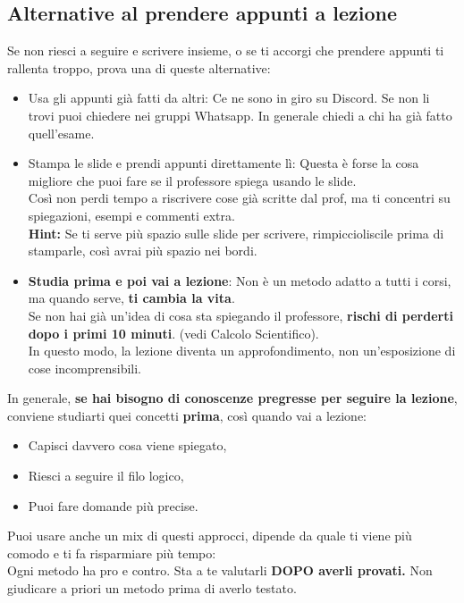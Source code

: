 \documentclass[18pt]{extarticle}
\begin{document}
\subsection{Alternative al prendere appunti a lezione}
Se non riesci a seguire e scrivere insieme, o se ti accorgi che prendere appunti ti rallenta troppo, prova una di queste alternative:
\begin{itemize}
\item Usa gli appunti già fatti da altri: Ce ne sono in giro su Discord. Se non li trovi puoi chiedere nei gruppi Whatsapp. In generale chiedi a chi ha già fatto quell'esame.
\item Stampa le slide e prendi appunti direttamente lì: Questa è forse la cosa migliore che puoi fare se il professore spiega usando le slide.\\
  Così non perdi tempo a riscrivere cose già scritte dal prof, ma ti concentri su spiegazioni, esempi e commenti extra.\\
  \textbf{Hint:} Se ti serve più spazio sulle slide per scrivere, rimpiccioliscile prima di stamparle, così avrai più spazio nei bordi.
\item \textbf{Studia prima e poi vai a lezione}: Non è un metodo adatto a tutti i corsi, ma quando serve, \textbf{ti cambia la vita}.\\
  Se non hai già un'idea di cosa sta spiegando il professore, \textbf{rischi di perderti dopo i primi 10 minuti}. (vedi Calcolo Scientifico).\\
  In questo modo, la lezione diventa un approfondimento, non un'esposizione di cose incomprensibili.
\end{itemize}
In generale, \textbf{se hai bisogno di conoscenze pregresse per seguire la lezione}, conviene studiarti quei concetti \textbf{prima}, così quando vai a lezione:
\begin{itemize}
\item Capisci davvero cosa viene spiegato,
\item Riesci a seguire il filo logico,
\item Puoi fare domande più precise.
\end{itemize}
Puoi usare anche un mix di questi approcci, dipende da quale ti viene più comodo e ti fa risparmiare più tempo:\\
Ogni metodo ha pro e contro. Sta a te valutarli \textbf{DOPO averli provati.} Non giudicare a priori un metodo prima di averlo testato.
\end{document}

